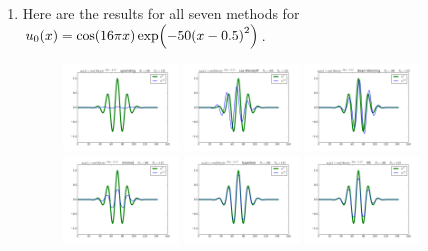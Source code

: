 \documentclass{article} %
\theoremstyle{plain}
\numberwithin{equation}{section} %
\numberwithin{figure}{section} %
\numberwithin{table}{section} %
\begin{document}
\begin{enumerate}[\ \ (a)]
    \pagebreak
    \item
        Here are the results for all seven methods for $u_0(x) = \cos(16\pi x)\exp(-50\qty(x - 0.5)^2)$.
        \begin{figure}[ht!]
            \centering
            \includegraphics[width=0.29\textwidth]{figures/power_4/problem_2_1_1_a.png}
            \includegraphics[width=0.29\textwidth]{figures/power_4/problem_2_1_2_a.png}
            \includegraphics[width=0.29\textwidth]{figures/power_4/problem_2_1_3_a.png}
            \includegraphics[width=0.29\textwidth]{figures/power_4/problem_2_1_4_a.png}
            \includegraphics[width=0.29\textwidth]{figures/power_4/problem_2_1_5_a.png}
            \includegraphics[width=0.29\textwidth]{figures/power_4/problem_2_1_6_a.png}

\end{figure}
\end{enumerate}
\end{document}
